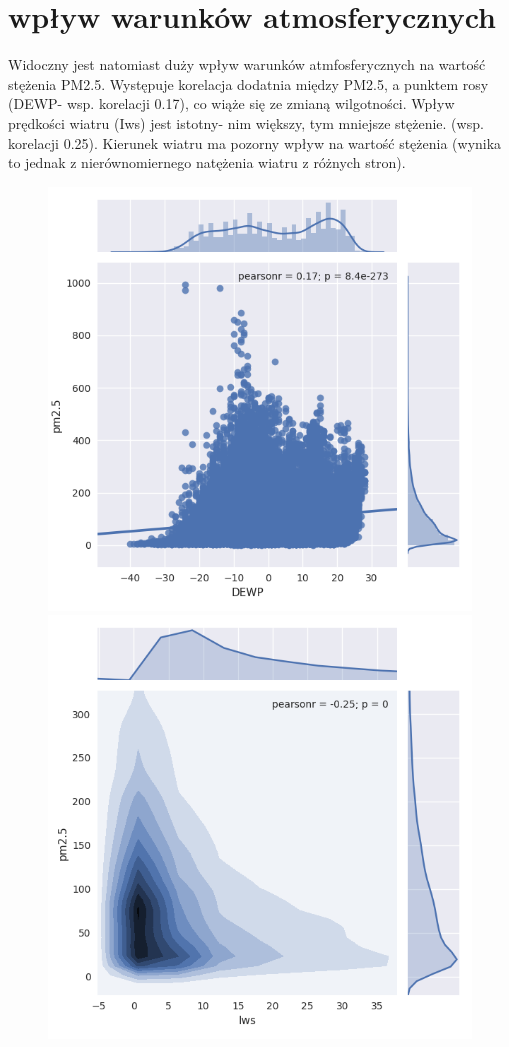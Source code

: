 \documentclass{beamer}
\begin{document}
\section{wpływ warunków atmosferycznych}
\begin{frame}
	Widoczny jest natomiast duży wpływ warunków atmfosferycznych na wartość stężenia PM2.5. Występuje korelacja dodatnia między PM2.5, a punktem rosy (DEWP- wsp. korelacji 0.17),
	co wiąże się ze zmianą wilgotności. Wpływ prędkości wiatru (Iws) jest istotny- nim większy, tym mniejsze stężenie. (wsp. korelacji 0.25). Kierunek wiatru ma pozorny wpływ na wartość stężenia (wynika to jednak z nierównomiernego natężenia wiatru z różnych stron).
	\begin{figure}
		\centering
		\begin{minipage}{.5\textwidth}
			\centering
			\includegraphics[width=0.7\linewidth]{dewp}
		\end{minipage}%
		\begin{minipage}{.5\textwidth}
			\centering
			\includegraphics[width=0.7\linewidth]{Iws}
		\end{minipage}
	\end{figure}

\end{frame}
\end{document}
